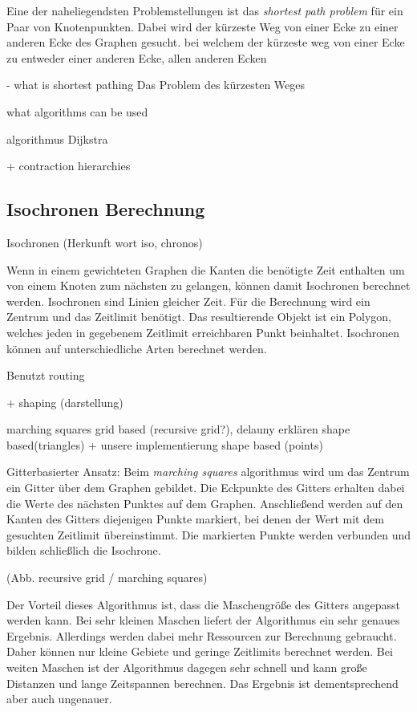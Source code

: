\documentclass[10pt,a4paper]{report}
\begin{document}
Eine der naheliegendsten Problemstellungen ist das \textit{shortest path problem} für ein Paar von Knotenpunkten. Dabei wird der kürzeste Weg von einer Ecke zu einer anderen Ecke des Graphen gesucht. bei welchem der kürzeste weg von einer Ecke zu entweder einer anderen Ecke, allen anderen Ecken 

- what is shortest pathing
Das Problem des kürzesten Weges 


what algorithms can be used

algorithmus Dijkstra 

+ contraction hierarchies

\subsection{Isochronen Berechnung}

Isochronen (Herkunft wort iso, chronos)

Wenn in einem gewichteten Graphen die Kanten die benötigte Zeit enthalten um von einem Knoten zum nächsten zu gelangen, können damit Isochronen berechnet werden.
Isochronen sind Linien gleicher Zeit. Für die Berechnung wird ein Zentrum und das Zeitlimit benötigt. Das resultierende Objekt ist ein Polygon, welches jeden in gegebenem Zeitlimit erreichbaren Punkt beinhaltet.
Isochronen können auf unterschiedliche Arten berechnet werden. 

Benutzt routing

+ shaping (darstellung)

marching squares grid based (recursive grid?), delauny erklären shape based(triangles) + unsere implementierung shape based (points)

Gitterbasierter Ansatz:
Beim \textit{marching squares} algorithmus wird um das Zentrum ein Gitter über dem Graphen gebildet. Die Eckpunkte des Gitters erhalten dabei die Werte des nächsten Punktes auf dem Graphen. Anschließend werden auf den Kanten des Gitters diejenigen Punkte markiert, bei denen der Wert mit dem gesuchten Zeitlimit übereinstimmt. Die markierten Punkte werden verbunden und bilden schließlich die Isochrone.

(Abb. recursive grid / marching squares)

Der Vorteil dieses Algorithmus ist, dass die Maschengröße des Gitters angepasst werden kann. Bei sehr kleinen Maschen liefert der Algorithmus ein sehr genaues Ergebnis. Allerdings werden dabei mehr Ressourcen zur Berechnung gebraucht. Daher können nur kleine Gebiete und geringe Zeitlimits berechnet werden. Bei weiten Maschen ist der Algorithmus dagegen sehr schnell und kann große Distanzen und lange Zeitspannen berechnen. Das Ergebnis ist dementsprechend aber auch ungenauer.
\end{document}
